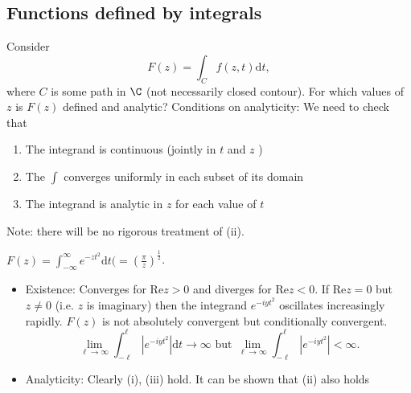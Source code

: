 \documentclass[a4paper]{article}
\begin{document}
\subsection{Functions defined by integrals}
Consider 
\[
    F(z) = \int_{C} f(z, t) \text{d}t
,\]
where $C$ is some path in $\C$ (not necessarily closed contour). For which values of $z$ is $F(z)$ defined and analytic? Conditions on analyticity: We need to check that 
\begin{enumerate}
    \item The integrand is continuous (jointly in $t $ and $z$ )
    \item The $\int$ converges uniformly in each subset of its domain
    \item The integrand is analytic in $z$ for each value of $t$
\end{enumerate}
Note: there will be no rigorous treatment of (ii).
\begin{eg}
    $F(z) = \int_{- \infty}^{\infty} e^{ - z t^2} \text{d}t \text{(} = \left( \frac{\pi}{z} \right)^{\frac{1}{2}}$\text{)}.
    \begin{itemize}
        \item  Existence: Converges for $\text{Re} z > 0$ and diverges for $\text{Re} z < 0$. If $\text{Re} z = 0$ but $z\ne 0$ (i.e. $z$ is imaginary) then the integrand $e^{ - i yt^2} $ oscillates increasingly rapidly. $F(z)$ is not absolutely convergent but conditionally convergent.
            \[
                \lim_{\ell \to \infty} \int_{- \ell}^{\ell} | e^{ - i y t^2} |\text{d} t \to \infty \text{ but } \lim_{ \ell \to \infty} \int_{- \ell}^{\ell} | e^{ - i y t^2} | < \infty
            .\] 
        \item Analyticity: Clearly (i), (iii) hold. It can be shown that (ii) also holds 
        \end{itemize}
\end{eg}
\end{document}
